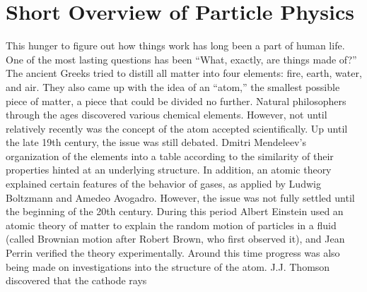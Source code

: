 \section{Short Overview of Particle Physics}
This hunger to figure out how things work has long 
been a part of human life.  
One of the most lasting questions has been 
``What, exactly, are things made of?'' 
The ancient Greeks tried to distill all matter into 
four elements: fire, earth, water, and air.  %
They also came up with the idea of an ``atom,'' 
the smallest possible piece of matter, 
a piece that could be divided no further.  
Natural philosophers through the ages 
discovered various chemical elements.  
However, not until relatively recently was 
the concept of the atom accepted scientifically. %
Up until the late 19th century, 
the issue was still debated.  
Dmitri Mendeleev's organization of the elements 
into a table according to the similarity of their properties 
hinted at an underlying structure.  
In addition, an atomic theory explained certain 
features of the behavior of gases, 
as applied by Ludwig Boltzmann and 
Amedeo Avogadro.  
However, the issue was not fully settled until 
the beginning of the 20th century.  
During this period 
Albert Einstein used an atomic theory of matter 
to explain the random motion of particles in a fluid %
(called Brownian motion after Robert Brown, who first observed it), 
and Jean Perrin verified the theory experimentally.  
Around this time progress was also being made 
on investigations into the structure of the atom.  
J.J. Thomson discovered that the cathode rays 
